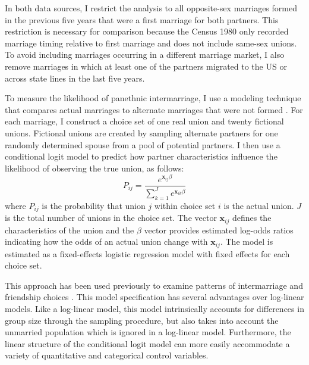 \documentclass[11pt,]{article}
\begin{document}
In both data sources, I restrict the analysis to all opposite-sex marriages formed in the previous five years that were a first marriage for both partners. This restriction is necessary for comparison because the Census 1980 only recorded marriage timing relative to first marriage and does not include same-sex unions. To avoid including marriages occurring in a different marriage market, I also remove marriages in which at least one of the partners migrated to the US or across state lines in the last five years.

To measure the likelihood of panethnic intermarriage, I use a modeling technique that compares actual marriages to alternate marriages that were not formed \citep{gullickson_counterfactual_2021}. For each marriage, I construct a choice set of one real union and twenty fictional unions. Fictional unions are created by sampling alternate partners for one randomly determined spouse from a pool of potential partners. I then use a conditional logit model to predict how partner characteristics influence the likelihood of observing the true union, as follows: \[P_{ij}=\frac{e^{\mathbf{x}_{ij}\beta}}{\sum_{k=1}^J e^{\mathbf{x}_{ik}\beta}}\] where \(P_{ij}\) is the probability that union \(j\) within choice set \(i\) is the actual union. \(J\) is the total number of unions in the choice set. The vector \(\mathbf{x}_{ij}\) defines the characteristics of the union and the \(\beta\) vector provides estimated log-odds ratios indicating how the odds of an actual union change with \(\mathbf{x}_{ij}\). The model is estimated as a fixed-effects logistic regression model with fixed effects for each choice set.

This approach has been used previously to examine patterns of intermarriage \citep{dalmia_empirical_2001, jepsen_empirical_2002, nielsen_educational_2009, qian_marriage_2018} and friendship choices \citep{zeng_preference_2008}. This model specification has several advantages over log-linear models. Like a log-linear model, this model intrinsically accounts for differences in group size through the sampling procedure, but also takes into account the unmarried population which is ignored in a log-linear model. Furthermore, the linear structure of the conditional logit model can more easily accommodate a variety of quantitative and categorical control variables.
\end{document}
